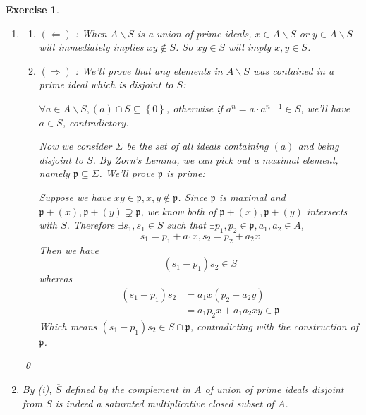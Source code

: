 \documentclass{article}
\theoremstyle{breakstyle}
\newtheorem{exercise}{Exercise}
\begin{document}
\begin{exercise}
    \leavevmode \vspace{-\baselineskip}
    \begin{enumerate}[label=({\roman*})]
        \item 
            \begin{enumerate}[label=({\Roman*})]
                \item $(\Leftarrow)$ :
                    When $A\backslash S$ is a union of prime ideals, $x\in A\backslash S$ or $y\in A\backslash S$ will immediately implies $xy\not\in S$.
                    So $xy\in S$ will imply $x,y\in S$.
                \item $(\Rightarrow)$ :
                    We'll prove that any elements in $A\backslash S$ was contained in a prime ideal which is disjoint to $S$:

                    $\forall a\in A\backslash S,(a)\cap S\subseteq \left\{ 0 \right\} $,
                    otherwise if $a^{n}=a\cdot a^{n-1}\in S$,
                    we'll have $a\in S$, contradictory.

                    Now we consider $\Sigma$ be the set of all ideals containing $(a)$ and being disjoint to $S$.
                    By \emph{Zorn's Lemma}, we can pick out a maximal element, namely $\mathfrak{p}\subseteq \Sigma$.
                    We'll prove $\mathfrak{p}$ is prime:

                    Suppose we have $xy\in \mathfrak{p},x,y\not\in \mathfrak{p}$.
                    Since $\mathfrak{p}$ is maximal and $\mathfrak{p}+(x),\mathfrak{p}+(y)\supsetneq \mathfrak{p}$,
                    we know both of $\mathfrak{p}+(x),\mathfrak{p}+(y)$ intersects with $S$.
                    Therefore $\exists s_1,s_1\in S$ such that $\exists p_1,p_2\in \mathfrak{p},a_1,a_2\in A$,
                    $$
                    s_1=p_1+a_1x,s_2=p_2+a_2x
                    $$
                    Then we have
                    $$
                    (s_1-p_1)s_2\in S
                    $$
                    whereas
                    \begin{align*}
                        (s_1-p_1)s_2&= a_1x(p_2+a_2y) \\
                        &= a_1p_2x+a_1a_2xy\in \mathfrak{p}
                    \end{align*}
                    Which means $(s_1-p_1)s_2\in S\cap \mathfrak{p}$, contradicting with the construction of $\mathfrak{p}$.
            \end{enumerate}
            \qed
        \item 
            By \emph{(i)}, $\overline{S}$ defined by the complement in $A$ of union of prime ideals disjoint from $S$ is indeed a saturated multiplicative closed subset of $A$.


\end{enumerate}
\end{exercise}
\end{document}
